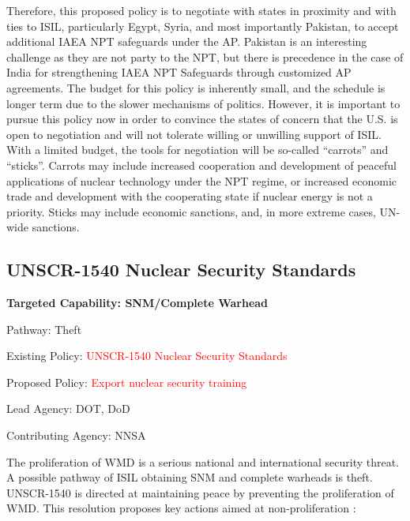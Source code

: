 \documentclass{report}
\begin{document}
Therefore, this proposed policy is to negotiate with states in proximity and with ties to ISIL, particularly Egypt, Syria, and most importantly Pakistan, to accept additional IAEA NPT safeguards under the AP. Pakistan is an interesting challenge as they are not party to the NPT, but there is precedence in the case of India for strengthening IAEA NPT Safeguards through customized AP agreements. The budget for this policy is inherently small, and the schedule is longer term due to the slower mechanisms of politics.  However, it is important to pursue this policy now in order to convince the states of concern that the U.S. is open to negotiation and will not tolerate willing or unwilling support of ISIL. With a limited budget, the tools for negotiation will be so-called \enquote{carrots} and \enquote{sticks}. Carrots may include increased cooperation and development of peaceful applications of nuclear technology under the NPT regime, or increased economic trade and development with the cooperating state if nuclear energy is not a priority. Sticks may include economic sanctions, and, in more extreme cases, UN-wide sanctions.



\subsection{UNSCR-1540 Nuclear Security Standards}



\bfseries Targeted Capability: SNM/Complete Warhead

Pathway: Theft

Existing Policy:  \textcolor{red}{UNSCR-1540 Nuclear Security Standards}

Proposed Policy:  \textcolor{red}{Export nuclear security training}

Lead Agency: DOT, DoD

Contributing Agency: NNSA  \normalfont


The proliferation of  WMD is a serious national and international security threat. A possible pathway of ISIL obtaining SNM and complete warheads is theft.  UNSCR-1540 is directed at maintaining peace by preventing the proliferation of  WMD. This resolution proposes key actions aimed at non-proliferation \cite{Gomes2007a}:
\end{document}
